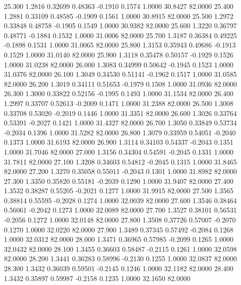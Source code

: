   25.300   1.2816   0.32699   0.48363  -0.1910   0.1574   1.0000  30.8427  82.0000
  25.400   1.2881   0.33109   0.48585  -0.1909   0.1561   1.0000  30.8915  82.0000
  25.500   1.2972   0.33848   0.48758  -0.1905   0.1549   1.0000  30.9382  82.0000
  25.600   1.3220   0.36797   0.48771  -0.1884   0.1532   1.0000  31.0006  82.0000
  25.700   1.3187   0.36384   0.49225  -0.1898   0.1531   1.0000  31.0065  82.0000
  25.800   1.3153   0.35943   0.49686  -0.1913   0.1529   1.0000  31.0140  82.0000
  25.900   1.3118   0.35478   0.50157  -0.1929   0.1526   1.0000  31.0238  82.0000
  26.000   1.3083   0.34999   0.50642  -0.1945   0.1523   1.0000  31.0376  82.0000
  26.100   1.3049   0.34530   0.51141  -0.1962   0.1517   1.0000  31.0585  82.0000
  26.200   1.3019   0.34111   0.51653  -0.1979   0.1508   1.0000  31.0936  82.0000
  26.300   1.3000   0.33822   0.52156  -0.1995   0.1493   1.0000  31.1534  82.0000
  26.400   1.2997   0.33707   0.52613  -0.2009   0.1471   1.0000  31.2388  82.0000
  26.500   1.3008   0.33708   0.53020  -0.2019   0.1446   1.0000  31.3351  82.0000
  26.600   1.3026   0.33764   0.53391  -0.2027   0.1421   1.0000  31.4327  82.0000
  26.700   1.3050   0.33849   0.53734  -0.2034   0.1396   1.0000  31.5282  82.0000
  26.800   1.3079   0.33959   0.54051  -0.2040   0.1373   1.0000  31.6193  82.0000
  26.900   1.3114   0.34103   0.54337  -0.2043   0.1351   1.0000  31.7046  82.0000
  27.000   1.3156   0.34304   0.54591  -0.2045   0.1331   1.0000  31.7811  82.0000
  27.100   1.3208   0.34603   0.54812  -0.2045   0.1315   1.0000  31.8465  82.0000
  27.200   1.3270   0.35058   0.55011  -0.2043   0.1301   1.0000  31.8982  82.0000
  27.300   1.3350   0.35820   0.55181  -0.2039   0.1290   1.0000  31.9407  82.0000
  27.400   1.3532   0.38287   0.55205  -0.2021   0.1277   1.0000  31.9915  82.0000
  27.500   1.3565   0.38814   0.55595  -0.2028   0.1274   1.0000  32.0039  82.0000
  27.600   1.3546   0.38464   0.56061  -0.2042   0.1273   1.0000  32.0089  82.0000
  27.700   1.3527   0.38101   0.56531  -0.2056   0.1272   1.0000  32.0148  82.0000
  27.800   1.3508   0.37726   0.57007  -0.2070   0.1270   1.0000  32.0220  82.0000
  27.900   1.3489   0.37345   0.57492  -0.2084   0.1268   1.0000  32.0312  82.0000
  28.000   1.3471   0.36965   0.57985  -0.2099   0.1265   1.0000  32.0432  82.0000
  28.100   1.3455   0.36603   0.58487  -0.2115   0.1261   1.0000  32.0598  82.0000
  28.200   1.3441   0.36283   0.58996  -0.2130   0.1255   1.0000  32.0837  82.0000
  28.300   1.3432   0.36039   0.59501  -0.2145   0.1246   1.0000  32.1182  82.0000
  28.400   1.3432   0.35897   0.59987  -0.2158   0.1235   1.0000  32.1650  82.0000
